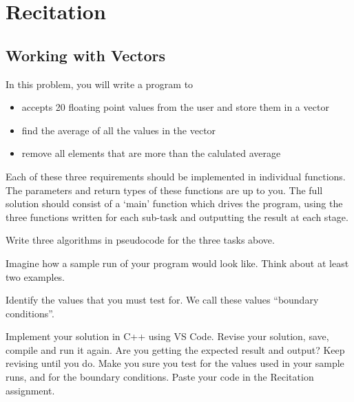 \section{Recitation}

\subsection{Working with Vectors}
In this problem, you will write a program to

\begin{itemize}
    \item accepts 20 floating point values from the user and store them in a vector
    \item find the average of all the values in the vector
    \item remove all elements that are more than the calulated average
\end{itemize}

Each of these three requirements should be implemented in individual functions. The parameters and return types of these functions are up to you. The full solution should consist of a `main' function which drives the program, using the three functions written for each sub-task and outputting the result at each stage. 

\begin{multipart}
Write three algorithms in pseudocode for the three tasks above.
\end{multipart}

\vspace{6cm}

\begin{multipart}
Imagine how a sample run of your program would look like. Think about at least two examples.
\end{multipart}

\vspace{6cm}

\begin{multipart}
Identify the values that you must test for. We call these values ``boundary conditions”.
\end{multipart}

\vspace{6cm}

Implement your solution in C++ using VS Code. Revise your solution, save, compile and run it again. Are you getting the expected result and output? Keep revising until you do. Make you sure you test for the values used in your sample runs, and for the boundary conditions. Paste your code in the Recitation assignment.

